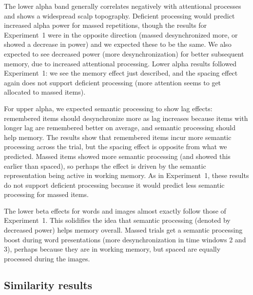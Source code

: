 The lower alpha band generally correlates negatively with attentional processes and shows a widespread scalp topography.  Deficient processing would predict increased alpha power for massed repetitions, though the results for Experiment~1 were in the opposite direction (massed desynchronized more, or showed a decrease in power) and we expected these to be the same.  We also expected to see decreased power (more desynchronization) for better subsequent memory, due to increased attentional processing.
Lower alpha results followed Experiment~1: we see the memory effect just described, and the spacing effect again does not support deficient processing (more attention seems to get allocated to massed items).


For upper alpha,
we expected semantic processing to show lag effects: remembered items should desynchronize more as lag increases because items with longer lag are remembered better on average, and semantic processing should help memory.  The results show that remembered items incur more semantic processing across the trial, but the spacing effect is opposite from what we predicted.  Massed items showed more semantic processing (and showed this earlier than spaced), so perhaps the effect is driven by the semantic representation being active in working memory.  As in Experiment~1, these results do not support deficient processing because it would predict less semantic processing for massed items.

The lower beta effects for words and images almost exactly follow those of Experiment~1.  This solidifies the idea that semantic processing (denoted by decreased power) helps memory overall.  Massed trials get a semantic processing boost during word presentations (more desynchronization in time windows 2 and 3), perhaps because they are in working memory, but spaced are equally processed during the images.

\subsection{Similarity results}

